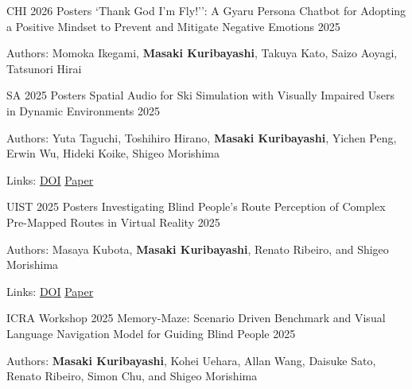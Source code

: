 \begin{cventries}
\end{cventries}


\begin{cventries}

  \cventry
    {CHI 2026 Posters}
    {`Thank God I’m Fly!'': A Gyaru Persona Chatbot for Adopting a Positive Mindset to Prevent and Mitigate Negative Emotions}
    {}
    {2025}
    {
      \begin{cvitems}
        \item {Authors: Momoka Ikegami, \textbf{Masaki Kuribayashi}, Takuya Kato, Saizo Aoyagi, Tatsunori Hirai}
      \end{cvitems}
    }

  \cventry
    {SA 2025 Posters}
    {Spatial Audio for Ski Simulation with Visually Impaired Users in Dynamic Environments}
    {}
    {2025}
    {
      \begin{cvitems}
        \item {Authors: Yuta Taguchi, Toshihiro Hirano, \textbf{Masaki Kuribayashi}, Yichen Peng, Erwin Wu, Hideki Koike, Shigeo Morishima}
        \item {Links: \href{https://doi.org/10.1145/3757374.3771466}{DOI} \enskip\textbar\enskip \href{https://chestnutforestlabo.github.io/website/data/project/yuta_taguchi_sa_2025/paper.pdf}{Paper}}
      \end{cvitems}
    }

  \cventry
    {UIST 2025 Posters}
    {Investigating Blind People's Route Perception of Complex Pre-Mapped Routes in Virtual Reality}
    {}
    {2025}
    {
      \begin{cvitems}
        \item {Authors: Masaya Kubota, \textbf{Masaki Kuribayashi}, Renato Ribeiro, and Shigeo Morishima}
        \item {Links: \href{https://doi.org/10.1145/3746058.3758403}{DOI} \enskip\textbar\enskip \href{https://chestnutforestlabo.github.io/website/data/project/masaya_kubota_uist_2025/paper.pdf}{Paper}}
      \end{cvitems}
    }

  \cventry
    {ICRA Workshop 2025}
    {Memory-Maze: Scenario Driven Benchmark and Visual Language Navigation Model for Guiding Blind People}
    {}
    {2025}
    {
      \begin{cvitems}
        \item {Authors: \textbf{Masaki Kuribayashi}, Kohei Uehara, Allan Wang, Daisuke Sato, Renato Ribeiro, Simon Chu, and Shigeo Morishima}
      \end{cvitems}
    }


\end{cventries}
